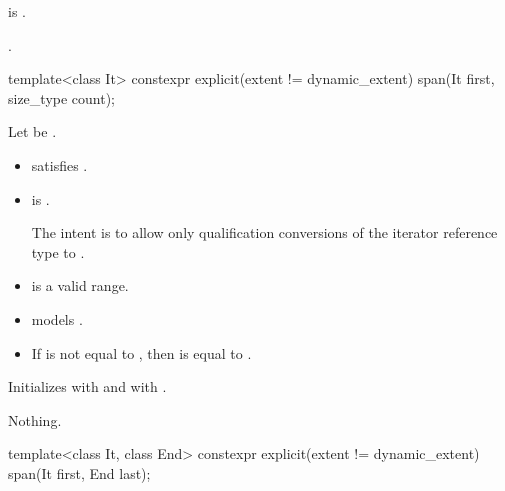 \begin{itemdescr}
\pnum
\constraints
{} is .

\pnum
\ensures
{}.
\end{itemdescr}

%
\begin{itemdecl}
template<class It>
  constexpr explicit(extent != dynamic_extent) span(It first, size_type count);
\end{itemdecl}

\begin{itemdescr}
\pnum
\constraints
Let  be .
\begin{itemize}
\item {} satisfies .
\item
{} is .
\begin{note}
The intent is to allow only qualification conversions
of the iterator reference type to .
\end{note}
\end{itemize}

\pnum
\expects
\begin{itemize}
\item {} is a valid range.
\item {} models .
\item
If  is not equal to ,
then  is equal to .
\end{itemize}

\pnum
\effects
Initializes  with  and
 with .

\pnum
\throws
Nothing.
\end{itemdescr}

%
\begin{itemdecl}
template<class It, class End>
  constexpr explicit(extent != dynamic_extent) span(It first, End last);
\end{itemdecl}

